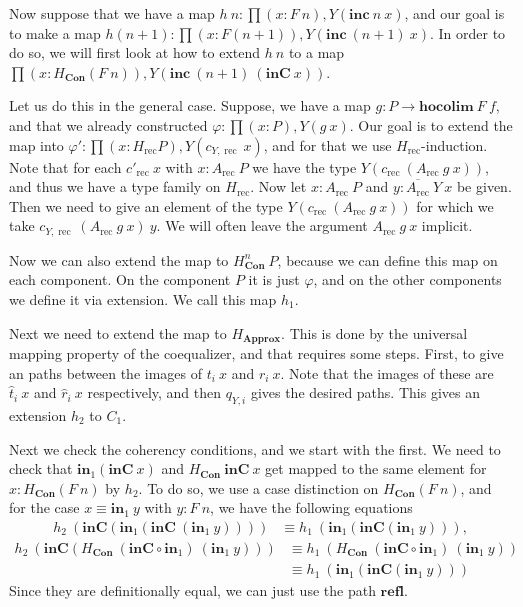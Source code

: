 \documentclass[a4paper,UKenglish]{lipics-v2016}
\newcommand{\Boperator}[1]{\mathrm{\mathbf{#1}}}
\newcommand{\inn}{\Boperator{in}}
\newcommand{\rec}[0]{\operatorname{rec}}
\newcommand{\Con}[0]{\textbf{Con}}
\newcommand{\Approx}[0]{\textbf{Approx}}
\newcommand{\refl}[0]{\Boperator{refl}}
\newcommand{\inC}[0]{\Boperator{inC}}
\newcommand{\hocolim}[0]{\Boperator{hocolim}}
\newcommand{\inc}[0]{\Boperator{inc}}
\newcommand{\dak}[1]{\widehat{#1}}
\newcommand{\hatt}{\dak{t}}
\newcommand{\hatr}{\dak{r}}
\begin{document}
Now suppose that we have a map $h \> n : \prod (x : F \> n), Y(\inc \> n \> x)$, and our goal is to make a map $h(n+1) : \prod  (x : F(n+1)), Y(\inc \> (n+1) \> x)$.
In order to do so, we will first look at how to extend $h \> n$ to a map $\prod (x : H_{\Con} (F \> n)), Y(\inc \> (n+1) \> (\inC \> x))$.

Let us do this in the general case.
Suppose, we have a map $g : P \rightarrow \hocolim \> F \> f$, and that we already constructed $\varphi : \prod (x : P), Y(g \> x)$.
Our goal is to extend the map into $\varphi' : \prod (x : H_{\rec} P), Y(c_{Y, \rec} \> x)$, and for that we use $H_{\rec}$-induction.
Note that for each $c'_{\rec} \> x$ with $x : A_{\rec} \> P$ we have the type $Y(c_{\rec} \> (A_{\rec} \> g \> x))$, and thus we have a type family on $H_{\rec}$.
Now let $x : A_{\rec} \> P$ and $y : \overline{A_{\rec}} \> Y \> x$ be given.
Then we need to give an element of the type $Y(c_{\rec} \> (A_{\rec} \> g \> x))$ for which we take $c_{Y,\rec} \> (A_{\rec} \> g \> x) \> y$.
We will often leave the argument $A_{\rec} \> g \> x$ implicit.

Now we can also extend the map to $H_{\Con}^n \> P$, because we can define this map on each component.
On the component $P$ it is just $\varphi$, and on the other components we define it via extension.
We call this map $h_1$.

Next we need to extend the map to $H_{\Approx}$.
This is done by the universal mapping property of the coequalizer, and that requires some steps.
First, to give an paths between the images of $t_i \> x$ and $r_i \> x$.
Note that the images of these are $\hatt_i \> x$ and $\hatr_i \> x$ respectively, and then $q_{Y, i}$ gives the desired paths.
This gives an extension $h_2$ to $C_1$.

Next we check the coherency conditions, and we start with the first.
We need to check that $\inn_1(\inC \> x)$ and $H_{\Con} \> \inC \> x$ get mapped to the same element for $x : H_{\Con}(F \> n)$ by $h_2$.
To do so, we use a case distinction on $H_{\Con}(F \> n)$, and for the case $x \equiv \inn_1 \> y$ with $y : F \> n$, we have the following equations 
\begin{equation*}
\begin{split}
h_2 \> (\inC(\inn_1(\inC \> (\inn_1 \> y))))
&\equiv 
h_1 \> (\inn_1(\inC(\inn_1 \> y))),
\end{split}
\end{equation*}
\begin{equation*}
\begin{split}
h_2 \> (\inC(H_{\Con} \> (\inC \circ \inn_1) \> (\inn_1 \> y)))
&\equiv
h_1 \> (H_{\Con} \> (\inC \circ \inn_1) \> (\inn_1 \> y))\\
&\equiv 
h_1 \> (\inn_1(\inC(\inn_1 \> y)))
\end{split}
\end{equation*}
Since they are definitionally equal, we can just use the path $\refl$.
\end{document}
